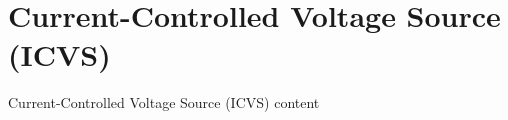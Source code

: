\section{Current-Controlled Voltage Source (ICVS)}
\begin{frame}{Current-Controlled Voltage Source (ICVS)}
	content
\end{frame}